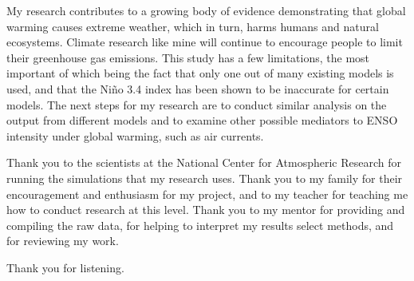 \documentclass{basic}
\begin{document}
My research contributes to a growing body of evidence demonstrating that global warming causes extreme weather, which in turn, harms humans and natural ecosystems. Climate research like mine will continue to encourage people to limit their greenhouse gas emissions. This study has a few limitations, the most important of which being the fact that only one out of many existing models is used, and that the Niño 3.4 index has been shown to be inaccurate for certain models. The next steps for my research are to conduct similar analysis on the output from different models and to examine other possible mediators to ENSO intensity under global warming, such as air currents.

Thank you to the scientists at the National Center for Atmospheric Research for running the simulations that my research uses. Thank you to my family for their encouragement and enthusiasm for my project, and to my teacher for teaching me how to conduct research at this level. Thank you to my mentor for providing and compiling the raw data, for helping to interpret my results select methods, and for reviewing my work.

Thank you for listening.
\end{document}
